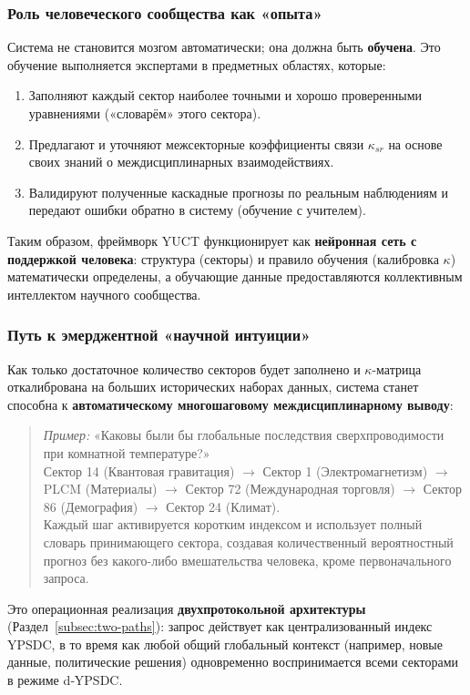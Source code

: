 \documentclass[11pt,a4paper]{article}
\begin{document}
	\subsubsection*{Роль человеческого сообщества как «опыта»}
	Система не становится мозгом автоматически; она должна быть \textbf{обучена}. Это обучение выполняется экспертами в предметных областях, которые:
	\begin{enumerate}[leftmargin=*]
		\item Заполняют каждый сектор наиболее точными и хорошо проверенными уравнениями («словарём» этого сектора).
		\item Предлагают и уточняют межсекторные коэффициенты связи \(\kappa_{sr}\) на основе своих знаний о междисциплинарных взаимодействиях.
		\item Валидируют полученные каскадные прогнозы по реальным наблюдениям и передают ошибки обратно в систему (обучение с учителем).
	\end{enumerate}
	Таким образом, фреймворк YUCT функционирует как \textbf{нейронная сеть с поддержкой человека}: структура (секторы) и правило обучения (калибровка \(\kappa\)) математически определены, а обучающие данные предоставляются коллективным интеллектом научного сообщества.
	
	\subsubsection*{Путь к эмерджентной «научной интуиции»}
	Как только достаточное количество секторов будет заполнено и \(\kappa\)-матрица откалибрована на больших исторических наборах данных, система станет способна к \textbf{автоматическому многошаговому междисциплинарному выводу}:
	
	\begin{quote}
		\emph{Пример:} «Каковы были бы глобальные последствия сверхпроводимости при комнатной температуре?»\\
		\noindent
		Сектор 14 (Квантовая гравитация) \(\to\) Сектор 1 (Электромагнетизм) \(\to\) PLCM (Материалы) \(\to\) Сектор 72 (Международная торговля) \(\to\) Сектор 86 (Демография) \(\to\) Сектор 24 (Климат).\\
		\noindent
		Каждый шаг активируется коротким индексом и использует полный словарь принимающего сектора, создавая количественный вероятностный прогноз без какого-либо вмешательства человека, кроме первоначального запроса.
	\end{quote}
	
	Это операционная реализация \textbf{двухпротокольной архитектуры} (Раздел~\ref{subsec:two-paths}): запрос действует как централизованный индекс YPSDC, в то время как любой общий глобальный контекст (например, новые данные, политические решения) одновременно воспринимается всеми секторами в режиме d‑YPSDC.
	
\end{document}

